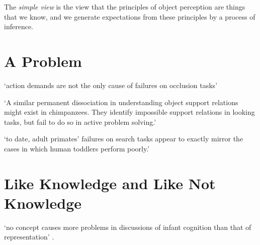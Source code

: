 \documentclass[12pt]{extarticle}
\begin{document}
\begin{multicols}{3}
The \emph{simple view} is the view that the principles of object perception are things that we know, and we generate expectations from these principles by a process of inference.
 
 
 
\section{A Problem}
 
‘action demands are not the only cause of failures on occlusion tasks’
\citep[p.\ 291]{shinskey:2012_disappearing}
 
‘A similar permanent dissociation in understanding object support relations might exist in chimpanzees. They identify impossible support relations in looking tasks, but fail to do so in active problem solving.’
\citep{gomez:2005_species}
 
‘to date, adult primates’ failures on search tasks appear to exactly mirror the cases in which human toddlers perform poorly.’
\citep[p.\ 17]{santos:2009_object}
 
 
 
\section{Like Knowledge and Like Not Knowledge}
 
‘no concept causes more problems in discussions of infant cognition than that of representation’
\citep{Haith:1998aq}.
  

 
\footnotesize 


\end{multicols}
\end{document}
